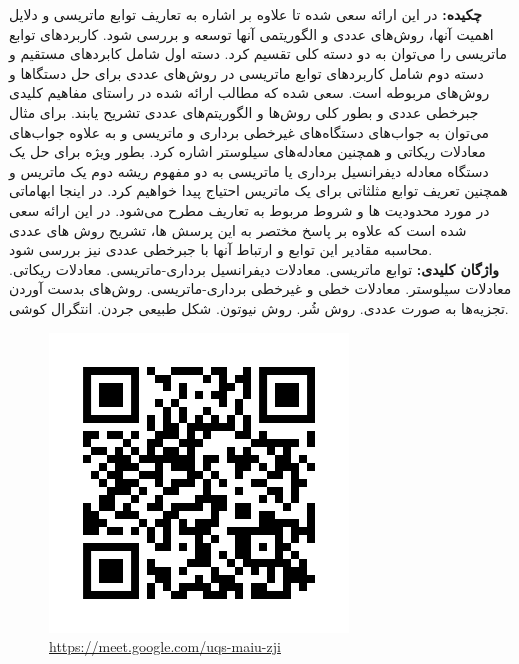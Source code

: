 \documentclass[12pt, a4paper]{article}
\begin{document}
\begin{titlepage}
\begin{center}
\end{center}
\noindent
\textbf{چکیده:}
در این ارائه سعی شده تا علاوه بر اشاره به تعاریف توابع ماتریسی و دلایل اهمیت آنها، روش‌های عددی و الگوریتمی آنها توسعه و بررسی شود.
کاربرد‌های توابع ماتریسی را می‌توان به دو دسته کلی تقسیم کرد.
دسته اول شامل کابردهای مستقیم و دسته دوم شامل کاربردهای توابع ماتریسی در روش‌های عددی برای حل دستگاها و روش‌های مربوطه است.
سعی شده که مطالب ارائه شده در راستای مفاهیم کلیدی جبرخطی عددی و بطور کلی روش‌ها و الگوریتم‌های عددی تشریح یابند.
برای مثال می‌توان به جواب‌های دستگاه‌های غیرخطی برداری و ماتریسی و به علاوه جواب‌های معادلات ریکاتی و همچنین معادله‌های سیلوستر اشاره کرد.
بطور ویژه برای حل یک دستگاه معادله دیفرانسیل برداری یا ماتریسی به دو مفهوم ریشه دوم یک ماتریس و همچنین تعریف توابع مثلثاتی برای یک ماتریس احتیاج پیدا خواهیم کرد. در اینجا ابهاماتی در مورد محدودیت ها و شروط مربوط به تعاریف مطرح می‌شود.
در این ارائه سعی شده است که علاوه بر پاسخ مختصر به این پرسش ها، تشریح روش های عددی محاسبه مقادیر این توابع  و  ارتباط آنها با جبرخطی عددی نیز بررسی شود.
\vspace{4mm}
\\
\noindent
\textbf{واژگان کلیدی:}
توابع ماتریسی. معادلات دیفرانسیل برداری-ماتریسی. معادلات ریکاتی. معادلات سیلوستر. معادلات خطی و غیرخطی برداری-ماتریسی. روش‌های بدست آوردن تجزیه‌ها به صورت عددی. روش شُر. روش نیوتون. شکل طبیعی جردن. انتگرال کوشی.
\begin{figure}[h]
\centering
\includegraphics[scale=0.35]{./qr.png}
\caption*{\url{https://meet.google.com/uqs-maiu-zji}}
\end{figure}
\end{titlepage}
\end{document}
